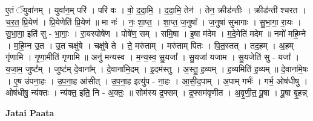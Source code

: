 \documentclass[17pt]{extarticle}
\begin{document}
ए॒तं ॅयुवा॑नम् । युवा॑न॒म् परि॑ । परि॑ वः । वो॒ द॒दा॒मि॒ । द॒दा॒मि॒ तेन॑ । तेन॒ क्रीड॑न्तीः । क्रीड॑न्ती श्चरत । च॒र॒त॒ प्रि॒येण॑ । प्रि॒येणेति॑ प्रि॒येण॑ ॥ मा नः॑ । नः॒ शा॒प्त॒ । शा॒प्त॒ ज॒नुषा᳚ । ज॒नुषा॑ सुभागाः । सु॒भा॒गा॒ रा॒यः । सु॒भा॒गा॒ इति॑ सु - भा॒गाः॒ । रा॒यस्पोषे॑ण । पोषे॑ण॒ सम् । समि॒षा । इ॒षा म॑देम । म॒दे॒मेति॑ मदेम ॥ नमो॑ महि॒म्ने । म॒हि॒म्न उ॒त । उ॒त चक्षु॑षे । चक्षु॑षे ते । ते॒ मरु॑ताम् । मरु॑ताम् पितः । पि॒त॒स्तत् । तद॒हम् । अ॒हम् गृ॑णामि । गृ॒णा॒मीति॑ गृणामि ॥ अनु॑ मन्यस्व । म॒न्य॒स्व॒ सु॒यजा᳚ । सु॒यजा॑ यजाम । सु॒यजेति॑ सु - यजा᳚ । य॒जा॒म॒ जुष्ट᳚म् । जुष्ट॑म् दे॒वाना᳚म् । दे॒वाना॑मि॒दम् । इ॒दम॑स्तु । अ॒स्तु॒ ह॒व्यम् । ह॒व्यमिति॑ ह॒व्यम् ॥ दे॒वाना॑मे॒षः । ए॒ष उ॑पना॒हः । उ॒प॒ना॒ह आ॑सीत् । उ॒प॒ना॒ह इत्यु॑प - ना॒हः । आ॒सी॒द॒पाम् । अ॒पाम् गर्भः॑ । गर्भ॒ ओष॑धीषु । ओष॑धीषु॒ न्य॑क्तः । न्य॑क्त॒ इति॒ नि - अ॒क्तः॒ ॥ सोम॑स्य द्र॒फ्सम् । द्र॒फ्सम॑वृणीत । अ॒वृ॒णी॒त॒ पू॒षा । पू॒षा बृ॒हन्न् \newline

\textbf{Jatai Paata} \newline
\end{document}
